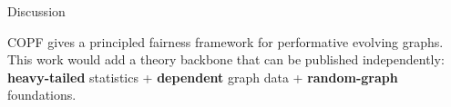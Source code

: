 \documentclass[aspectratio=169,11pt]{beamer}
\newcommand{\1}{\mathbbm{1}}
\begin{document}
\begin{frame}{Discussion}

COPF gives a principled fairness framework for performative evolving graphs.
This work would add a theory backbone that can be published independently:
\textbf{heavy-tailed} statistics + \textbf{dependent} graph data + \textbf{random-graph} foundations.



\end{frame}

\end{document}
